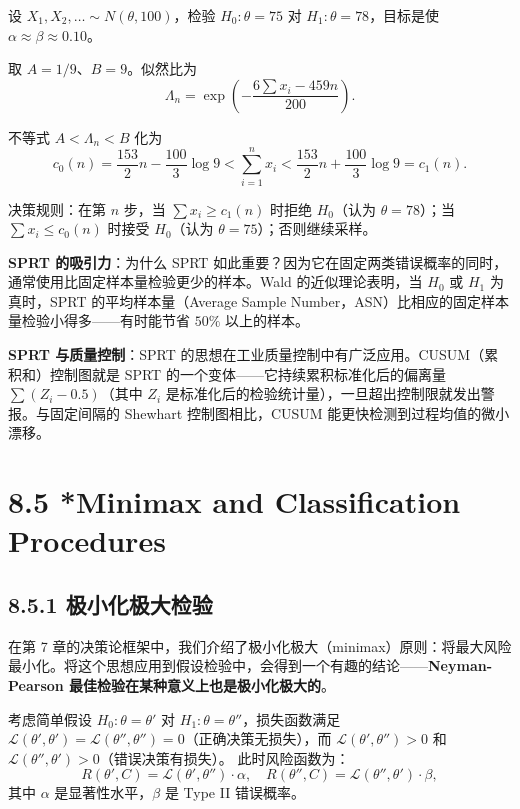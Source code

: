 \begin{example}\label{ex:normal-sprt}
设 $X_1, X_2, \ldots \sim N(\theta, 100)$，检验 $H_0: \theta = 75$ 对 $H_1: \theta = 78$，目标是使 $\alpha \approx \beta \approx 0.10$。

取 $A = 1/9$、$B = 9$。似然比为
\[
\Lambda_n = \exp\left(-\frac{6\sum x_i - 459n}{200}\right).
\]

不等式 $A < \Lambda_n < B$ 化为
\[
c_0(n) = \frac{153}{2}n - \frac{100}{3}\log 9 < \sum_{i=1}^n x_i < \frac{153}{2}n + \frac{100}{3}\log 9 = c_1(n).
\]

决策规则：在第 $n$ 步，当 $\sum x_i \geq c_1(n)$ 时拒绝 $H_0$（认为 $\theta = 78$）；当 $\sum x_i \leq c_0(n)$ 时接受 $H_0$（认为 $\theta = 75$）；否则继续采样。\end{example}

\textbf{SPRT 的吸引力}：为什么 SPRT 如此重要？因为它在固定两类错误概率的同时，通常使用比固定样本量检验更少的样本。Wald 的近似理论表明，当 $H_0$ 或 $H_1$ 为真时，SPRT 的平均样本量（Average Sample Number，ASN）比相应的固定样本量检验小得多——有时能节省 $50\%$ 以上的样本。

\textbf{SPRT 与质量控制}：SPRT 的思想在工业质量控制中有广泛应用。CUSUM（累积和）控制图就是 SPRT 的一个变体——它持续累积标准化后的偏离量 $\sum (Z_i - 0.5)$（其中 $Z_i$ 是标准化后的检验统计量），一旦超出控制限就发出警报。与固定间隔的 Shewhart 控制图相比，CUSUM 能更快检测到过程均值的微小漂移。

\section{8.5 *Minimax and Classification Procedures}\label{sec:8.5}

\subsection{8.5.1 极小化极大检验}

在第 7 章的决策论框架中，我们介绍了极小化极大（minimax）原则：将最大风险最小化。将这个思想应用到假设检验中，会得到一个有趣的结论——\textbf{Neyman-Pearson 最佳检验在某种意义上也是极小化极大的}。

考虑简单假设 $H_0: \theta = \theta'$ 对 $H_1: \theta = \theta''$，损失函数满足 $\mathcal{L}(\theta', \theta') = \mathcal{L}(\theta'', \theta'') = 0$（正确决策无损失），而 $\mathcal{L}(\theta', \theta'') > 0$ 和 $\mathcal{L}(\theta'', \theta') > 0$（错误决策有损失）。
此时风险函数为：
\[
R(\theta', C) = \mathcal{L}(\theta', \theta'') \cdot \alpha, \quad R(\theta'', C) = \mathcal{L}(\theta'', \theta') \cdot \beta,
\]
其中 $\alpha$ 是显著性水平，$\beta$ 是 Type II 错误概率。

